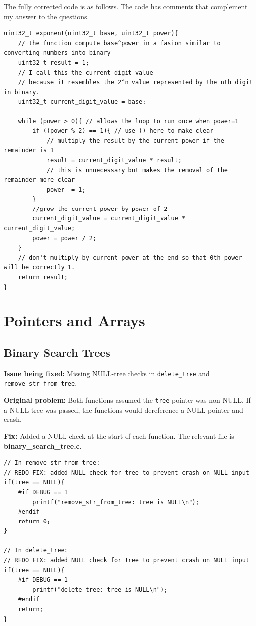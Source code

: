 \documentclass{exam}
\begin{document}
The fully corrected code is as follows. The code has comments that complement my answer to the questions.
\begin{verbatim}
uint32_t exponent(uint32_t base, uint32_t power){
    // the function compute base^power in a fasion similar to converting numbers into binary
    uint32_t result = 1;
    // I call this the current_digit_value
    // because it resembles the 2^n value represented by the nth digit in binary.
    uint32_t current_digit_value = base;

    while (power > 0){ // allows the loop to run once when power=1
        if ((power % 2) == 1){ // use () here to make clear
            // multiply the result by the current power if the remainder is 1
            result = current_digit_value * result;
            // this is unnecessary but makes the removal of the remainder more clear
            power -= 1;
        }
        //grow the current_power by power of 2
        current_digit_value = current_digit_value * current_digit_value;
        power = power / 2;
    }
    // don't multiply by current_power at the end so that 0th power will be correctly 1.
    return result;
}
\end{verbatim}

\section*{Pointers and Arrays}

\subsection*{Binary Search Trees}

\textbf{Issue being fixed:} Missing NULL-tree checks in \verb|delete_tree| and \verb|remove_str_from_tree|.

\textbf{Original problem:} Both functions assumed the \verb|tree| pointer was non-NULL.
If a NULL tree was passed, the functions would dereference a NULL pointer and crash.

\textbf{Fix:} Added a NULL check at the start of each function.
The relevant file is \textbf{binary\_search\_tree.c}.

\begin{verbatim}
// In remove_str_from_tree:
// REDO FIX: added NULL check for tree to prevent crash on NULL input
if(tree == NULL){
    #if DEBUG == 1
        printf("remove_str_from_tree: tree is NULL\n");
    #endif
    return 0;
}

// In delete_tree:
// REDO FIX: added NULL check for tree to prevent crash on NULL input
if(tree == NULL){
    #if DEBUG == 1
        printf("delete_tree: tree is NULL\n");
    #endif
    return;
}
\end{verbatim}
\end{document}
